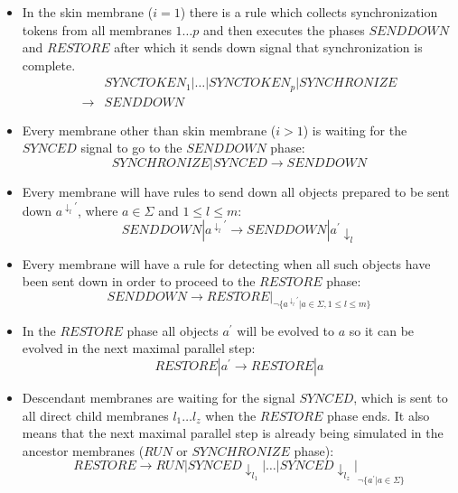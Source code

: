 \begin{dokaz}
\begin{itemize}
    \item In the skin membrane ($i=1$) there is a rule which collects synchronization tokens from all membranes $1\dots p$ and then executes the phases $\mathit{SENDDOWN}$ and $\mathit{RESTORE}$ after which it sends down signal that synchronization is complete.
    \begin{align*}
      &\mathit{SYNCTOKEN_1}|\dots|\mathit{SYNCTOKEN_p}|\mathit{SYNCHRONIZE} \\
      \rightarrow &\mathit{SENDDOWN}
    \end{align*}

    \item Every membrane other than skin membrane ($i>1$) is waiting for the $\mathit{SYNCED}$ signal to go to the $\mathit{SENDDOWN}$ phase:
    $$\mathit{SYNCHRONIZE}|\mathit{SYNCED} \rightarrow \mathit{SENDDOWN}$$

    \item Every membrane will have rules to send down all objects prepared to be sent down $a^{\downarrow_l\prime}$, where $a\in \Sigma$ and $1\leq l\leq m$:
    $$\mathit{SENDDOWN}|a^{\downarrow_l\prime} \rightarrow \mathit{SENDDOWN}|a^{\prime}\downarrow_l$$

    \item Every membrane will have a rule for detecting when all such objects have been sent down in order to proceed to the $\mathit{RESTORE}$ phase:
    $$\mathit{SENDDOWN} \rightarrow \mathit{RESTORE}|_{\neg \{a^{\downarrow_l\prime}|a\in\Sigma, 1\leq l\leq m\}}$$

    \item In the $\mathit{RESTORE}$ phase all objects $a^{\prime}$ will be evolved to $a$ so it can be evolved in the next maximal parallel step:
    $$\mathit{RESTORE}|a^{\prime} \rightarrow \mathit{RESTORE}|a$$

    \item Descendant membranes are waiting for the signal $\mathit{SYNCED}$, which is sent to all direct child membranes $l_1\dots l_z$ when the $\mathit{RESTORE}$ phase ends. It also means that the next maximal parallel step is already being simulated in the ancestor membranes ($\mathit{RUN}$ or $\mathit{SYNCHRONIZE}$ phase):
    $$\mathit{RESTORE} \rightarrow \mathit{RUN}|\mathit{SYNCED}\downarrow_{l_1}|\dots|\mathit{SYNCED}\downarrow_{l_z}|_{\neg \{a^{\prime}|a\in\Sigma\}}$$
  \end{itemize}

  \providecommand{\narrow}[1]{\scalebox{.85}[1.0]{#1}}


\end{dokaz}

